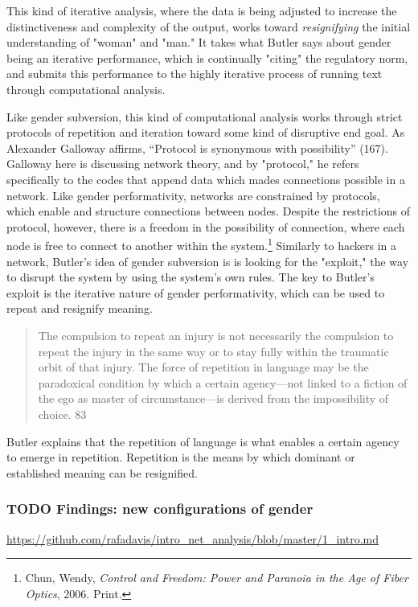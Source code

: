 \documentclass[11pt]{article}
\begin{document}
This kind of iterative analysis, where the data is being adjusted to
increase the distinctiveness and complexity of the output, works
toward \emph{resignifying} the initial understanding of "woman" and "man."
It takes what Butler says about gender being an iterative performance,
which is continually "citing" the regulatory norm, and submits this
performance to the highly iterative process of running text through
computational analysis. 

Like gender subversion, this kind of computational analysis works
through strict protocols of repetition and iteration toward some kind
of disruptive end goal. As Alexander Galloway affirms, “Protocol is
synonymous with possibility” (167). Galloway here is discussing
network theory, and by "protocol," he refers specifically to the codes
that append data which mades connections possible in a network. Like
gender performativity, networks are constrained by protocols, which
enable and structure connections between nodes. Despite the
restrictions of protocol, however, there is a freedom in the
possibility of connection, where each node is free to connect to
another within the system.\footnote{Chun, Wendy, \emph{Control and Freedom: Power and Paranoia in the
Age of Fiber Optics}, 2006. Print.} Similarly to hackers in a network,
Butler's idea of gender subversion is is looking for the "exploit,"
the way to disrupt the system by using the system’s own rules. The key
to Butler's exploit is the iterative nature of gender performativity,
which can be used to repeat and resignify meaning.
\begin{quote}
The compulsion to repeat an injury is not necessarily the compulsion
to repeat the injury in the same way or to stay fully within the
traumatic orbit of that injury. The force of repetition in language
may be the paradoxical condition by which a certain agency---not
linked to a fiction of the ego as master of circumstance---is derived
from the impossibility of choice. 83 
\end{quote}
Butler explains that the repetition of language is what enables
a certain agency to emerge in repetition. Repetition is the means by
which dominant or established meaning can be resignified. 

\subsubsection{{\bfseries\sffamily TODO} Findings: new configurations of gender}
\label{sec:orgc9efde6}
\url{https://github.com/rafadavis/intro\_net\_analysis/blob/master/1\_intro.md}
\end{document}
